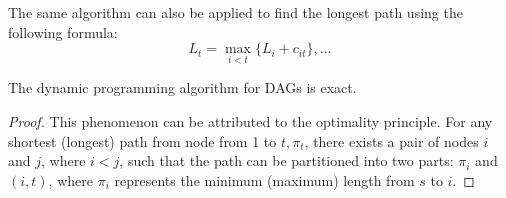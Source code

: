 \documentclass[12pt, a4paper]{report}
\begin{document}
    The same algorithm can also be applied to find the longest path using the following formula:
    \[L_t=\max_{i<t}\{L_i+c_{it}\},\dots\]

    \begin{proposition}
        The dynamic programming algorithm for DAGs is exact. 
    \end{proposition}
    \begin{proof}
        This phenomenon can be attributed to the optimality principle.
        For any shortest (longest) path from node from 1 to $t,\pi_t$, there exists a pair of nodes $i$ and $j$, where $i < j$,  such that the path can be partitioned into two parts: $\pi_i$ and $(i,t)$, where $\pi_i$ represents the minimum (maximum) length from $s$ to $i$.
    \end{proof}
\end{document}
